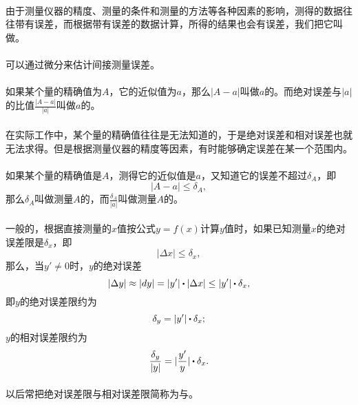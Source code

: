 \paragraph{}
由于测量仪器的精度、测量的条件和测量的方法等各种因素的影响，测得的数据往往带有误差，而根据带有误差的数据计算，所得的结果也会有误差，我们把它叫做。

\paragraph{}
可以通过微分来估计间接测量误差。

\paragraph{}
如果某个量的精确值为$A$，它的近似值为$a$，那么$|A-a|$叫做$a$的。而绝对误差与$|a|$的比值$\frac{|A-a|}{|a|}$叫做$a$的。

\paragraph{}
在实际工作中，某个量的精确值往往是无法知道的，于是绝对误差和相对误差也就无法求得。但是根据测量仪器的精度等因素，有时能够确定误差在某一个范围内。

\paragraph{}
如果某个量的精确值是$A$，测得它的近似值是$a$，又知道它的误差不超过$\delta_A$，即
\begin{equation}
  |A-a| \leq  \delta_A,
\end{equation}
那么$\delta_A$叫做测量$A$的，而$\frac{\delta_A}{|a|}$叫做测量$A$的。

\paragraph{}
一般的，根据直接测量的$x$值按公式$y=f(x)$计算$y$值时，如果已知测量$x$的绝对误差限是$\delta_x$，即
\begin{equation}
  |\Delta x| \leq \delta_x,
\end{equation}
那么，当$y' \neq 0$时，$y$的绝对误差
\begin{equation}
  |\Delta y| \approx |dy| = |y'| \bigcdot |\Delta x| \leq |y'| \bigcdot \delta_x,
\end{equation}
即$y$的绝对误差限约为
\begin{equation}
  \delta_y = |y'| \bigcdot \delta_x;
\end{equation}
$y$的相对误差限约为
\begin{equation}
  \frac{\delta_y}{|y|} = |\frac{y'}{y}| \bigcdot \delta_x.
\end{equation}

\paragraph{}
以后常把绝对误差限与相对误差限简称为与。
